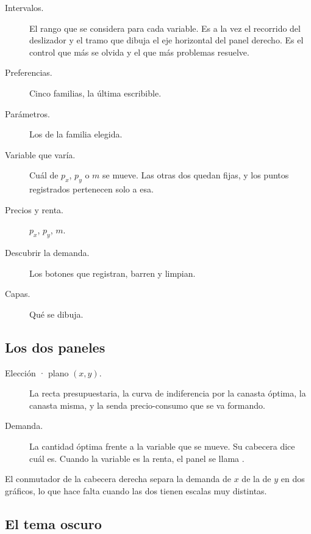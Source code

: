 \documentclass[11pt,a4paper]{appletmanual}
\begin{document}

\begin{description}
\item[Intervalos.] El rango que se considera para cada variable. Es a la vez el
  recorrido del deslizador y el tramo que dibuja el eje horizontal del panel
  derecho. Es el control que más se olvida y el que más problemas resuelve.
\item[Preferencias.] Cinco familias, la última escribible.
\item[Parámetros.] Los de la familia elegida.
\item[Variable que varía.] Cuál de $p_x$, $p_y$ o $m$ se mueve. Las otras dos
  quedan fijas, y los puntos registrados pertenecen solo a esa.
\item[Precios y renta.] $p_x$, $p_y$, $m$.
\item[Descubrir la demanda.] Los botones que registran, barren y limpian.
\item[Capas.] Qué se dibuja.
\end{description}

\subsection{Los dos paneles}

\begin{description}
\item[Elección · plano $(x, y)$.] La recta presupuestaria, la curva de
  indiferencia por la canasta óptima, la canasta misma, y la senda
  precio-consumo que se va formando.
\item[Demanda.] La cantidad óptima frente a la variable que se mueve. Su
  cabecera dice cuál es. Cuando la variable es la renta, el panel se llama
  .
\end{description}

El conmutador  de la cabecera derecha separa la demanda de
$x$ de la de $y$ en dos gráficos, lo que hace falta cuando las dos tienen
escalas muy distintas.


\subsection{El tema oscuro}
\end{document}
